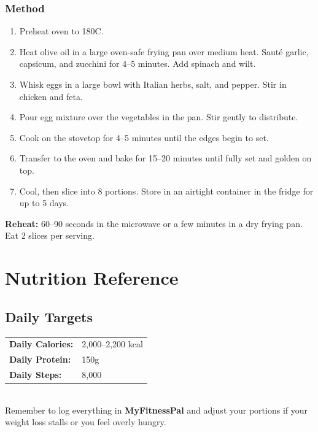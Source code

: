 \documentclass[12pt, a4paper]{book}
\newcommand{\methodheader}{\subsection*{\textcolor{accent}{Method}}}
\begin{document}
\methodheader
\begin{enumerate}[leftmargin=1.5em]
  \item Preheat oven to 180\textdegree C.
  \item Heat olive oil in a large oven-safe frying pan over medium heat. Saut\'{e} garlic, capsicum, and zucchini for 4--5 minutes. Add spinach and wilt.
  \item Whisk eggs in a large bowl with Italian herbs, salt, and pepper. Stir in chicken and feta.
  \item Pour egg mixture over the vegetables in the pan. Stir gently to distribute.
  \item Cook on the stovetop for 4--5 minutes until the edges begin to set.
  \item Transfer to the oven and bake for 15--20 minutes until fully set and golden on top.
  \item Cool, then slice into 8 portions. Store in an airtight container in the fridge for up to 5 days.
\end{enumerate}

\begin{tipbox}
  \textbf{Reheat:} 60--90 seconds in the microwave or a few minutes in a dry frying pan. Eat 2 slices per serving.
\end{tipbox}

\chapter{Nutrition Reference}

\section*{Daily Targets}

\begin{macrobox}
  \begin{tabular}{ll}
    \textbf{Daily Calories:} & 2,000--2,200 kcal \\
    \textbf{Daily Protein:}  & 150g \\
    \textbf{Daily Steps:}    & 8,000 \\
  \end{tabular}\\[8pt]
  Remember to log everything in \textbf{MyFitnessPal} and adjust your portions if your weight loss stalls or you feel overly hungry.
\end{macrobox}
\end{document}
